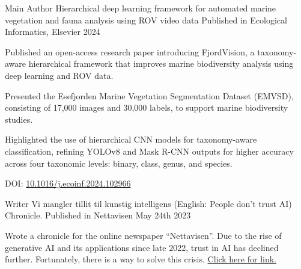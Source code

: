 
\begin{cventries}

  \cventry
    {Main Author} %
    {Hierarchical deep learning framework for automated marine vegetation and fauna analysis using ROV video data} %
    {Published in Ecological Informatics, Elsevier} %
    {2024} %
    {
      \begin{cvitems} %
        \item {Published an open-access research paper introducing FjordVision, a taxonomy-aware hierarchical framework that improves marine biodiversity analysis using deep learning and ROV data.}
        \item {Presented the Esefjorden Marine Vegetation Segmentation Dataset (EMVSD), consisting of 17,000 images and 30,000 labels, to support marine biodiversity studies.}
        \item {Highlighted the use of hierarchical CNN models for taxonomy-aware classification, refining YOLOv8 and Mask R-CNN outputs for higher accuracy across four taxonomic levels: binary, class, genus, and species.}
        \item {DOI: \href{https://doi.org/10.1016/j.ecoinf.2024.102966}{10.1016/j.ecoinf.2024.102966}}
      \end{cvitems}
    }

  \cventry
    {Writer} %
    {Vi mangler tillit til kunstig intelligens (English: People don't trust AI)} %
    {Chronicle. Published in Nettavisen} %
    {May 24th 2023} %
    {
      \begin{cvitems} %
        \item {Wrote a chronicle for the online newspaper ``Nettavisen''. Due to the rise of generative AI and its applications since late 2022, trust in AI has declined further. Fortunately, there is a way to solve this crisis. \href{https://www.nettavisen.no/norsk-debatt/vi-mangler-tillit-til-kunstig-intelligens/o/5-95-1109936}{Click here for link.}}
      \end{cvitems}
    }

\end{cventries}
